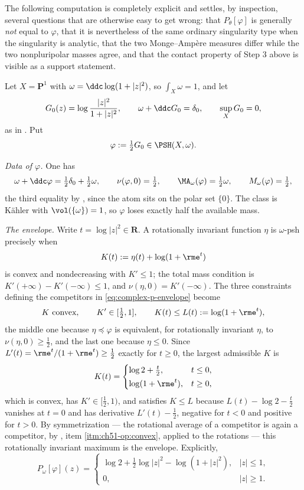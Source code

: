 The following computation is completely explicit and settles, by
inspection, several questions that are otherwise easy to get wrong: that
\(P_\theta[\varphi]\) is generally \emph{not} equal to \(\varphi\), that
it is nevertheless of the same ordinary singularity type when the
singularity is analytic, that the two Monge--Amp\`ere measures differ
while the two nonpluripolar masses agree, and that the contact property of
Step 3 above is visible as a support statement.

\begin{example}
\label{ex:ch51-p1-envelope}
Let \(X=\mathbf P^1\) with \(\omega=\ddc\log(1+|z|^2)\), so
\(\int_X\omega=1\), and let
\[
 G_0(z)=\log\frac{|z|^2}{1+|z|^2},
 \qquad
 \omega+\ddc G_0=\delta_0,\qquad \sup_XG_0=0,
\]
as in .  Put
\[
 \varphi:=\tfrac12G_0\in\PSH(X,\omega).
\]

\emph{Data of \(\varphi\).}  One has
\[
 \omega+\ddc\varphi=\tfrac12\delta_0+\tfrac12\omega,
 \qquad
 \nu(\varphi,0)=\tfrac12,
 \qquad
 \MA_\omega(\varphi)=\tfrac12\omega,
 \qquad
 M_\omega(\varphi)=\tfrac12 ,
\]
the third equality by , since the atom
sits on the polar set \(\{0\}\).  The class is K\"ahler with
\(\vol(\{\omega\})=1\), so \(\varphi\) loses exactly half the available
mass.

\emph{The envelope.}  Write \(t=\log|z|^2\in\mathbf R\).  A rotationally
invariant function \(\eta\) is \(\omega\)-psh precisely when
\[
 K(t):=\eta(t)+\log(1+\rme^{t})
\]
is convex and nondecreasing with \(K'\leq1\); the total mass condition is
\(K'(+\infty)-K'(-\infty)\leq1\), and
\(\nu(\eta,0)=K'(-\infty)\).  The three constraints defining the
competitors in \eqref{eq:complex-p-envelope} become
\[
 K\ \text{convex},\qquad
 K'\in[\tfrac12,1],\qquad
 K(t)\leq L(t):=\log(1+\rme^{t}),
\]
the middle one because \(\eta\preceq\varphi\) is equivalent, for
rotationally invariant \(\eta\), to \(\nu(\eta,0)\geq\frac12\), and the
last one because \(\eta\leq0\).  Since \(L'(t)=\rme^t/(1+\rme^t)\geq
\frac12\) exactly for \(t\geq0\), the largest admissible \(K\) is
\[
 K(t)=
 \begin{cases}
 \log2+\tfrac t2, & t\leq0,\\[2pt]
 \log(1+\rme^t), & t\geq0,
 \end{cases}
\]
which is convex, has \(K'\in[\frac12,1)\), and satisfies \(K\leq L\)
because \(L(t)-\log2-\frac t2\) vanishes at \(t=0\) and has derivative
\(L'(t)-\frac12\), negative for \(t<0\) and positive for \(t>0\).  By
symmetrization --- the rotational average of a competitor is again a
competitor, by , item
\cref{itm:ch51-op:convex}, applied to the rotations --- this
rotationally invariant maximum is the envelope.  Explicitly,
\[
 P_\omega[\varphi](z)=
 \begin{cases}
 \log2+\tfrac12\log|z|^2-\log(1+|z|^2), & |z|\leq1,\\[3pt]
 0, & |z|\geq1 .
 \end{cases}
\]


\end{example}
